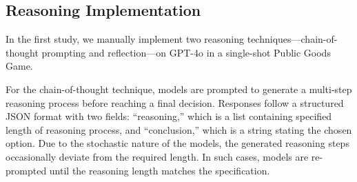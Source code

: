 \subsection*{Reasoning Implementation}\label{method1}
In the first study, we manually implement two reasoning techniques—chain-of-thought prompting and reflection—on GPT-4o in a single-shot Public Goods Game.

For the chain-of-thought technique, models are prompted to generate a multi-step reasoning process before reaching a final decision.  
Responses follow a structured JSON format with two fields: ``reasoning,'' which is a list containing specified length of reasoning process, and ``conclusion,'' which is a string stating the chosen option.  
Due to the stochastic nature of the models, the generated reasoning steps occasionally deviate from the required length.  
In such cases, models are re-prompted until the reasoning length matches the specification.
